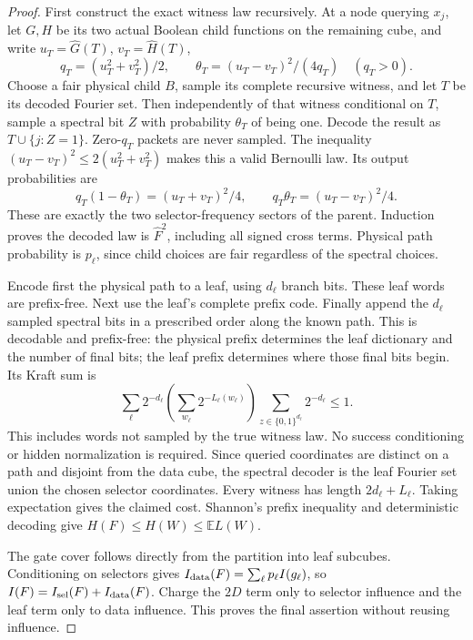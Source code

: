\documentclass{article}
\begin{document}
\begin{proof}
First construct the exact witness law recursively. At a node querying
$x_j$, let $G,H$ be its two actual Boolean child functions on the remaining
cube, and write $u_T=\widehat G(T)$, $v_T=\widehat H(T)$,
\[
 q_T=(u_T^2+v_T^2)/2,\qquad
 \theta_T=(u_T-v_T)^2/(4q_T)\quad(q_T>0).
\]
Choose a fair physical child $B$, sample its complete recursive witness,
and let $T$ be its decoded Fourier set. Then independently of that witness
conditional on $T$, sample a spectral bit $Z$ with probability
$\theta_T$ of being one. Decode the result as $T\cup\{j:Z=1\}$.
Zero-$q_T$ packets are never sampled. The inequality
$(u_T-v_T)^2\le2(u_T^2+v_T^2)$ makes this a valid Bernoulli law.
Its output probabilities are
\[
 q_T(1-\theta_T)=(u_T+v_T)^2/4,\qquad
 q_T\theta_T=(u_T-v_T)^2/4.
\]
These are exactly the two selector-frequency sectors of the parent.
Induction proves the decoded law is $\widehat F^2$, including all signed
cross terms. Physical path probability is $p_\ell$, since child choices
are fair regardless of the spectral choices.

Encode first the physical path to a leaf, using $d_\ell$ branch bits.
These leaf words are prefix-free. Next use the leaf's complete prefix
code. Finally append the $d_\ell$ sampled spectral bits in a prescribed
order along the known path. This is decodable and prefix-free: the physical
prefix determines the leaf dictionary and the number of final bits; the
leaf prefix determines where those final bits begin. Its Kraft sum is
\[
 \sum_\ell 2^{-d_\ell}
 \left(\sum_{w_\ell}2^{-L_\ell(w_\ell)}\right)
 \sum_{z\in\{0,1\}^{d_\ell}}2^{-d_\ell}\le1.
\]
This includes words not sampled by the true witness law. No success
conditioning or hidden normalization is required.
Since queried coordinates are distinct on a path and disjoint from the
data cube, the spectral decoder is the leaf Fourier set union the chosen
selector coordinates. Every witness has length $2d_\ell+L_\ell$.
Taking expectation gives the claimed cost. Shannon's prefix inequality
and deterministic decoding give $H(F)\le H(W)\le\mathbb E L(W)$.

The gate cover follows directly from the partition into leaf subcubes.
Conditioning on selectors gives
$I_{\rm data}(F)=\sum_\ell p_\ell I(g_\ell)$, so
$I(F)=I_{\rm sel}(F)+I_{\rm data}(F)$. Charge the $2D$ term only to
selector influence and the leaf term only to data influence. This proves
the final assertion without reusing influence.
\end{proof}
\end{document}
